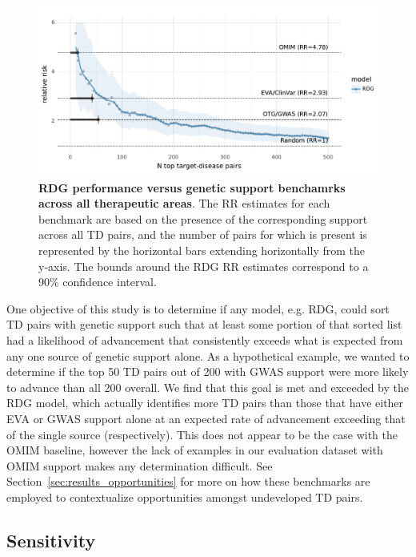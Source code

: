 \documentclass{article}
\begin{document}
\begin{figure}[!htb]
  \centering
  \captionsetup{width=.9\linewidth}
  \includegraphics[width=1\textwidth]{relative_risk_by_limit.pdf}
  \caption{
    \textbf{RDG performance versus genetic support benchamrks across all therapeutic areas}. The RR estimates for each benchmark are based on the presence of the corresponding support across all TD pairs, and the number of pairs for which is present is represented by the horizontal bars extending horizontally from the y-axis. The bounds around the RDG RR estimates correspond to a 90\% confidence interval.
  }
  \label{fig:relative_risk_by_limit}
\end{figure}

One objective of this study is to determine if any model, e.g. RDG, could sort TD pairs with genetic support such that at least some portion of that sorted list had a likelihood of advancement that consistently exceeds what is expected from any one source of genetic support alone. As a hypothetical example, we wanted to determine if the top 50 TD pairs out of 200 with GWAS support were more likely to advance than all 200 overall. We find that this goal is met and exceeded by the RDG model, which actually identifies more TD pairs than those that have either EVA or GWAS support alone at an expected rate of advancement exceeding that of the single source (respectively). This does not appear to be the case with the OMIM baseline, however the lack of examples in our evaluation dataset with OMIM support makes any determination difficult. See Section~\ref{sec:results_opportunities} for more on how these benchmarks are employed to contextualize opportunities amongst undeveloped TD pairs.

\subsection{Sensitivity}
\end{document}
